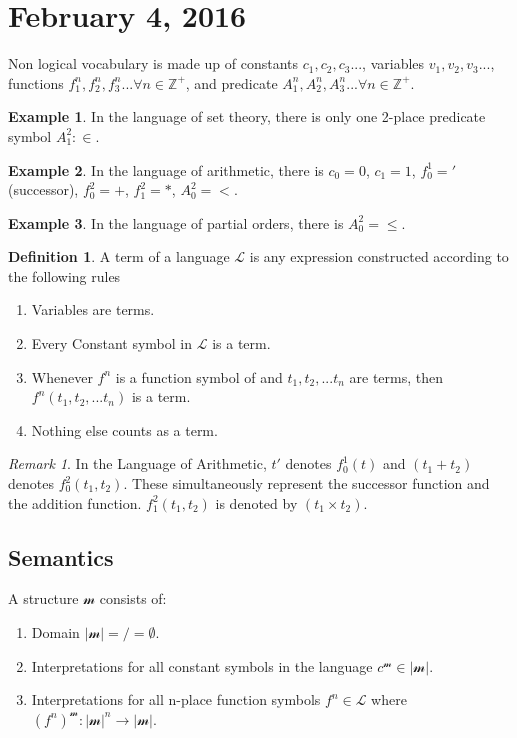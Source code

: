\documentclass[11pt]{article}
\theoremstyle{plain} %
\theoremstyle{definition}
\newtheorem*{definition}{Definition} %
\theoremstyle{example}
\newtheorem*{example}{Example}
\theoremstyle{remark}
\newtheorem*{remark}{Remark}
\begin{document}
\section{February 4, 2016}
Non logical vocabulary is made up of constants $c_1, c_2, c_3...$, variables $v_1, v_2, v_3...$, functions $f^n_1, f^n_2, f^n_3... \forall n \in \mathbb Z^+$, and predicate $A^n_1, A^n_2, A^n_3... \forall n \in \mathbb Z^+$.


\begin{example}
In the language of set theory, there is only one 2-place predicate symbol $A^2_1: \in$.
\end{example}


\begin{example}
In the language of arithmetic, there is $c_0 = 0$, $c_1 = 1$, $f^1_0 = ' $(successor), $f^2_0 = +$, $f^2_1 = *$, $A^2_0 = <$.\end{example}


\begin{example}
In the language of partial orders, there is $A^2_0 = \leq$.
\end{example}

\begin{definition}
A term of a language $\mathcal{L}$ is any expression constructed according to the following rules
	\begin{enumerate}
		\item Variables are terms.
		\item Every Constant symbol in $\mathcal{L}$ is a term.
		\item Whenever $f^n$ is a function symbol of  and $t_1, t_2,...t_n$ are terms, then $f^n(t_1,t_2,...t_n)$ is a term.
		\item Nothing else counts as a term.
	\end{enumerate}
\end{definition}

\begin{remark}
In the Language of Arithmetic, $t'$ denotes $f^1_0(t)$ and $(t_1+t_2)$ denotes $f^2_0(t_1, t_2)$. These simultaneously represent the successor function and the addition function. $f^2_1(t_1, t_2)$ is denoted by $(t_1 \times t_2)$.
\end{remark}

\subsection{Semantics}

A structure $\mathcal{m}$ consists of:
\begin{enumerate}
	\item Domain $|\mathcal{m}| =/= \emptyset$.
	\item Interpretations for all constant symbols in the language $c^\mathcal{m} \in |\mathcal{m}|$.
	\item Interpretations for all n-place function symbols $f^n \in \mathcal{L}$ where $(f^n)^\mathcal{m}: |\mathcal{m}|^n \to |\mathcal{m}|$.
\end{enumerate}
\end{document}

